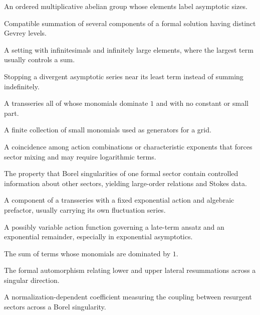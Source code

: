 \documentclass[11pt,oneside]{book}
\theoremstyle{definition}
\theoremstyle{remark}
\begin{document}
\begin{description}[style=nextline,leftmargin=2em]
\item[Monomial group]
An ordered multiplicative abelian group whose elements label asymptotic sizes.

\item[Multisummability]
Compatible summation of several components of a formal solution having distinct
Gevrey levels.

\item[Non-Archimedean]
A setting with infinitesimals and infinitely large elements, where the largest
term usually controls a sum.

\item[Optimal truncation]
Stopping a divergent asymptotic series near its least term instead of summing
indefinitely.

\item[Purely large]
A transseries all of whose monomials dominate $1$ and with no constant or small
part.

\item[Ratio set]
A finite collection of small monomials used as generators for a grid.

\item[Resonance]
A coincidence among action combinations or characteristic exponents that forces
sector mixing and may require logarithmic terms.

\item[Resurgence]
The property that Borel singularities of one formal sector contain controlled
information about other sectors, yielding large-order relations and Stokes data.

\item[Sector]
A component of a transseries with a fixed exponential action and algebraic
prefactor, usually carrying its own fluctuation series.

\item[Singulant]
A possibly variable action function governing a late-term ansatz and an
exponential remainder, especially in exponential asymptotics.

\item[Small part]
The sum of terms whose monomials are dominated by $1$.

\item[Stokes automorphism]
The formal automorphism relating lower and upper lateral resummations across a
singular direction.

\item[Stokes constant]
A normalization-dependent coefficient measuring the coupling between resurgent
sectors across a Borel singularity.


\end{description}
\end{document}
